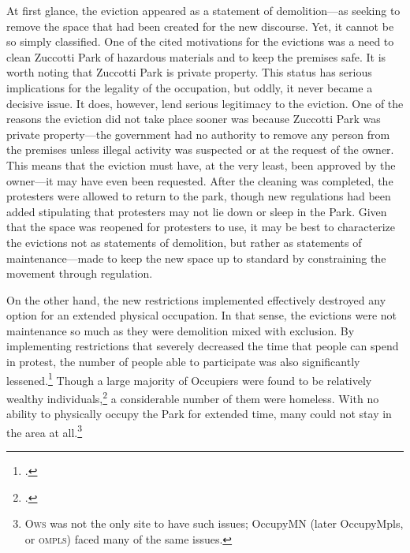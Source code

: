 \documentclass[openany,twoside]{memoir}
\begin{document}
\begin{Spacing}{2}
At first glance, the eviction appeared as a statement of demolition---as seeking to remove the space that had been created for the new discourse.
Yet, it cannot be so simply classified.
One of the cited motivations for the evictions was a need to clean Zuccotti Park of hazardous materials and to keep the premises safe.
It is worth noting that Zuccotti Park is private property. 
This status has serious implications for the legality of the occupation, but oddly, it never became a decisive issue.
It does, however, lend serious legitimacy to the eviction.
One of the reasons the eviction did not take place sooner was because Zuccotti Park was private property---the government had no authority to remove any person from the premises unless illegal activity was suspected or at the request of the owner. 
This means that the eviction must have, at the very least, been approved by the owner---it may have even been requested.
After the cleaning was completed, the protesters were allowed to return to the park, though new regulations had been added stipulating that protesters may not lie down or sleep in the Park.
Given that the space was reopened for protesters to use, it may be best to characterize the evictions not as statements of demolition, but rather as statements of maintenance---made to keep the new space up to standard by constraining the movement through regulation.

On the other hand, the new restrictions implemented effectively destroyed any option for an extended physical occupation.
In that sense, the evictions were not maintenance so much as they were demolition mixed with exclusion.
By implementing restrictions that severely decreased the time that people can spend in protest, the number of people able to participate was also significantly lessened.\footcite{barronmoynihan11}
Though a large majority of Occupiers were found to be relatively wealthy individuals,\footcite[10]{milkman13} a considerable number of them were homeless.
With no ability to physically occupy the Park for extended time, many could not stay in the area at all.\footnote{
\textsc{Ows} was not the only site to have such issues; OccupyMN (later OccupyMpls, or \textsc{ompls}) faced many of the same issues.}


\end{Spacing}
\end{document}
